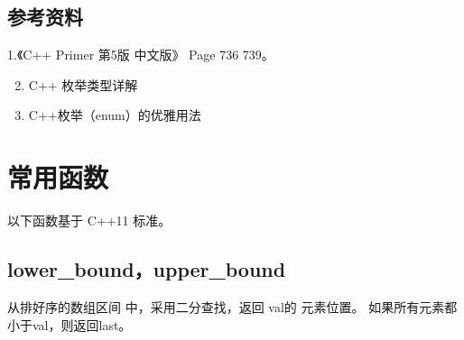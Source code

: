 \documentclass[letterpaper,10pt,english]{sphinxmanual}
\begin{document}
\subsection{参考资料}
\label{\detokenize{cpp/17_enumUnion:id6}}
1.《C++ Primer 第5版 中文版》 Page 736 \textendash{} 739。
\begin{enumerate}
\setcounter{enumi}{1}
\item {} 
C++ 枚举类型详解

\end{enumerate}
\begin{quote}

\end{quote}
\begin{enumerate}
\setcounter{enumi}{2}
\item {} 
C++枚举（enum）的优雅用法

\end{enumerate}
\begin{quote}

\end{quote}


\section{常用函数}
\label{\detokenize{cpp/18_commonFunc::doc}}\label{\detokenize{cpp/18_commonFunc:id1}}
以下函数基于 C++11 标准。


\subsection{lower\_bound，upper\_bound}
\label{\detokenize{cpp/18_commonFunc:lower-bound-upper-bound}}
%
\begin{sphinxVerbatim}[commandchars=\\\{\}]
 
\end{sphinxVerbatim}

 从排好序的数组区间 \sphinxstylestrong{{[}first,last)} 中，采用二分查找，返回  val的  元素位置。
如果所有元素都小于val，则返回last。

%
\begin{sphinxVerbatim}[commandchars=\\\{\}]
    
        
\end{sphinxVerbatim}
\end{document}
